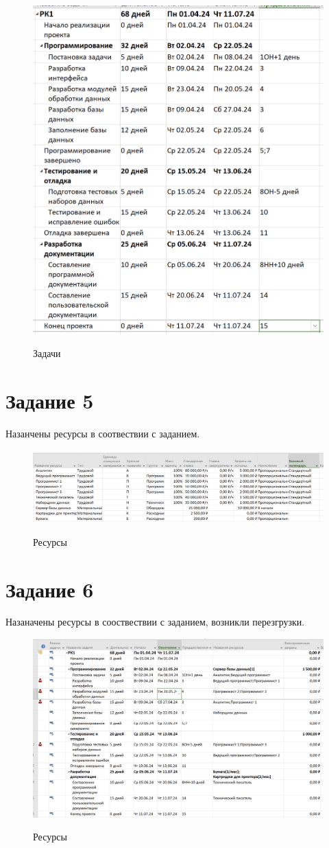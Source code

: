 \begin{figure}[ht!]
	\includegraphics[width=0.75\linewidth]{assets/images/4-task.png}
	\label{fig:r2}
	\caption{Задачи}
\end{figure}
\FloatBarrier


\section{Задание 5}

Назанчены ресурсы в соотвествии с заданием.

\begin{figure}[ht!]
	\includegraphics[width=0.75\linewidth]{assets/images/5-task.png}
	\label{fig:r2}
	\caption{Ресурсы}
\end{figure}
\FloatBarrier

\section{Задание 6}

Назаначены ресурсы в сооствествии с заданием, возникли перезгрузки.

\begin{figure}[ht!]
	\includegraphics[width=0.75\linewidth]{assets/images/6-tasks.png}
	\label{fig:r2}
	\caption{Ресурсы}
\end{figure}
\FloatBarrier

